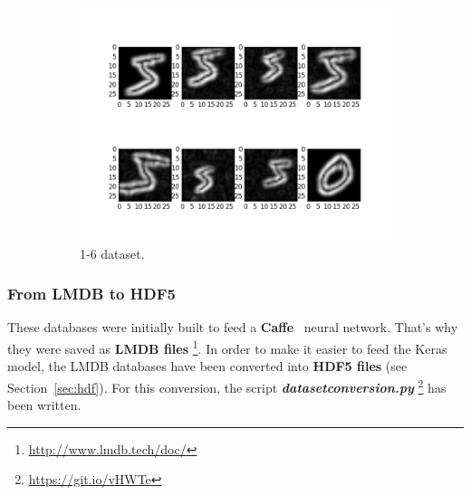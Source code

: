 \begin{figure}
\begin{subfigure}{0.5\textwidth}
		\includegraphics[width=1\linewidth]{figures/1-6.png}
		\caption{1-6 dataset.}\label{fig:1-6}
	\end{subfigure}
	\caption[First samples of handmade datasets.]{}
	\label{fig:aug_nuria}
\end{figure}

\subsubsection{From LMDB to HDF5} \label{subsubsec:lmdb2hdf5}
These databases were initially built to feed a \textbf{Caffe}~\cite{jia2014caffe} neural network. That's why they were saved as \textbf{LMDB files} \footnote{\url{http://www.lmdb.tech/doc/}}. In order to make it easier to feed the Keras model, the LMDB databases have been converted into \textbf{HDF5 files} (see Section~\ref{sec:hdf}). For this conversion, the script \textbf{\textit{datasetconversion.py}} \footnote{\url{https://git.io/vHWTe}} has been written.

